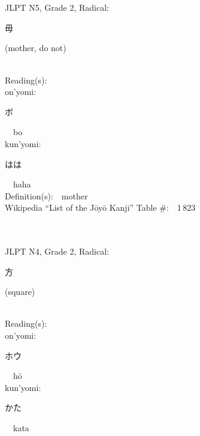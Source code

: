 \begin{multicols}{2}
\ \ \\
{\fontsize{34pt}{40pt}  }\ \ \\  %
{JLPT N5, Grade 2, Radical:\ \ {\begin{CJK}{UTF8}{min} 毋 \end{CJK}} (mother, do not) } \\
Reading(s):\ \ \\
{\hspace*{1em}}on'yomi:\ \ \\
{\hspace*{2em}}{\begin{CJK}{UTF8}{min} ボ \end{CJK}}\ \ bo\ \ \\
{\hspace*{1em}}kun'yomi:\ \ \\
{\hspace*{2em}}{\begin{CJK}{UTF8}{min} はは \end{CJK}}\ \ haha\ \ \\
Definition(s):\ \ mother \\
Wikipedia ``List of the J\=oy\=o Kanji'' Table \#:\ \ 1\,823 \\
\ \ \\
{\fontsize{34pt}{40pt}  }\ \ \\  %
{JLPT N4, Grade 2, Radical:\ \ {\begin{CJK}{UTF8}{min} 方 \end{CJK}} (square) } \\
Reading(s):\ \ \\
{\hspace*{1em}}on'yomi:\ \ \\
{\hspace*{2em}}{\begin{CJK}{UTF8}{min} ホウ \end{CJK}}\ \ h\=o\ \ \\
{\hspace*{1em}}kun'yomi:\ \ \\
{\hspace*{2em}}{\begin{CJK}{UTF8}{min} かた \end{CJK}}\ \ kata\ \ \\

\end{multicols}
